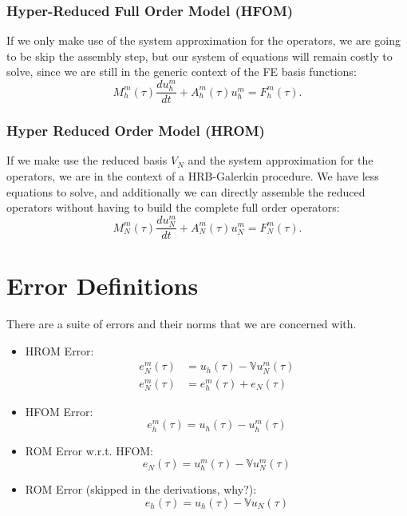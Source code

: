 \documentclass[../main.tex]{subfiles}
\begin{document}
\subsubsection{Hyper-Reduced Full Order Model (HFOM)}
If we only make use of the system approximation for the operators, we are going to be skip the assembly step, but our system of equations will remain costly to solve, since we are still in the generic context of the FE basis functions:
\begin{equation*}
    M_h^m (\tau) \frac{d u_h^m}{dt} + A_h^m (\tau) u_h^m  = F_h^m(\tau).
\end{equation*}

\subsubsection{Hyper Reduced Order Model (HROM)}
If we make use the reduced basis $V_N$ and the system approximation for the operators, we are in the context of a HRB-Galerkin procedure.
We have less equations to solve, and additionally we can directly assemble the reduced operators without having to build the complete full order operators:
\begin{equation*}
    M_N^m (\tau) \frac{d u_N^m}{dt} + A_N^m (\tau) u_N^m  = F_N^m(\tau).
\end{equation*}

\section{Error Definitions}
There are a suite of errors and their norms that we are concerned with.
\begin{itemize}
    \item HROM Error:
    \begin{align*}
        e_{N}^{m}(\tau) &= u_h(\tau) - \mathbb{V}u_N^m(\tau) \\
        e_{N}^{m}(\tau) &= e_{h}^{m}(\tau) + e_{N}(\tau)
    \end{align*}
    \item HFOM Error:
    \begin{equation*}
        e_{h}^{m}(\tau) = u_h(\tau) - u_h^m(\tau)
    \end{equation*}
    \item ROM Error w.r.t. HFOM:
    \begin{equation*}
        e_{N}(\tau) = u_h^{m}(\tau) - \mathbb{V}u_N^m(\tau)
    \end{equation*}
    \item ROM Error (skipped in the derivations, why?):
    \begin{equation*}
        e_{h}(\tau) = u_h(\tau) - \mathbb{V}u_N(\tau)
    \end{equation*}
\end{itemize}
\end{document}
